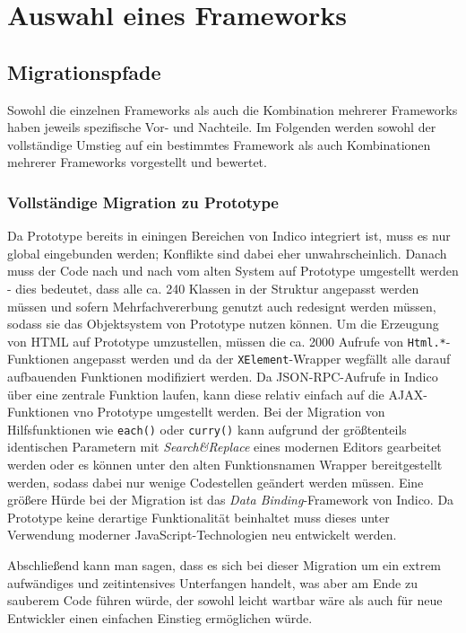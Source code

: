 \chapter{Auswahl eines Frameworks}

\section{Migrationspfade}
Sowohl die einzelnen Frameworks als auch die Kombination mehrerer Frameworks haben jeweils
spezifische Vor- und Nachteile. Im Folgenden werden sowohl der vollständige Umstieg auf ein
bestimmtes Framework als auch Kombinationen mehrerer Frameworks vorgestellt und bewertet.

\subsection{Vollständige Migration zu Prototype}
Da Prototype bereits in einingen Bereichen von Indico integriert ist, muss es nur global
eingebunden werden; Konflikte sind dabei eher unwahrscheinlich. Danach muss der Code nach und nach
vom alten System auf Prototype umgestellt werden - dies bedeutet, dass alle ca. 240 Klassen in der
Struktur angepasst werden müssen und sofern Mehrfachvererbung genutzt auch redesignt werden müssen,
sodass sie das Objektsystem von Prototype nutzen können. Um die Erzeugung von HTML auf Prototype
umzustellen, müssen die ca. 2000 Aufrufe von \lstinline{Html.*}-Funktionen angepasst werden und da
der \lstinline{XElement}-Wrapper wegfällt alle darauf aufbauenden Funktionen modifiziert werden. Da
JSON-RPC-Aufrufe in Indico über eine zentrale Funktion laufen, kann diese relativ einfach auf die
AJAX-Funktionen vno Prototype umgestellt werden. Bei der Migration von Hilfsfunktionen wie
\lstinline{each()} oder \lstinline{curry()} kann aufgrund der größtenteils identischen Parametern
mit \emph{Search\&Replace} eines modernen Editors gearbeitet werden oder es können unter den alten
Funktionsnamen Wrapper bereitgestellt werden, sodass dabei nur wenige Codestellen geändert werden
müssen. Eine größere Hürde bei der Migration ist das \emph{Data Binding}-Framework von Indico. Da
Prototype keine derartige Funktionalität beinhaltet muss dieses unter Verwendung moderner
JavaScript-Technologien neu entwickelt werden.

Abschließend kann man sagen, dass es sich bei dieser Migration um ein extrem aufwändiges und
zeitintensives Unterfangen handelt, was aber am Ende zu sauberem Code führen würde, der sowohl
leicht wartbar wäre als auch für neue Entwickler einen einfachen Einstieg ermöglichen würde.


